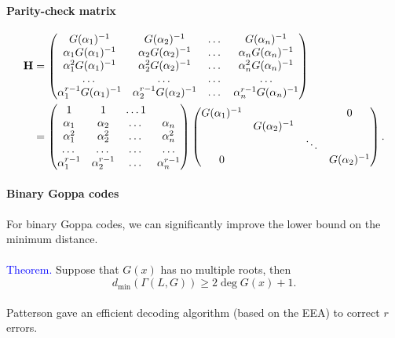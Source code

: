\documentclass[a4paper, 11pt, openany]{book}
\numberwithin{equation}{section}
\theoremstyle{plain}
\theoremstyle{definition}
\newcommand{\dmin}{d_{\min}}
\newcommand{\Structure}[1]{\textcolor{blue}{#1}}
\newcommand{\code}[1]{\mathsf{#1}}
\newcommand{\Goppa}                 {\code{\Gamma}}
\begin{document}
\paragraph{Parity-check matrix}

\begin{align*}
	{\bf H} &= \begin{pmatrix}
		G(\alpha_1)^{-1} & G(\alpha_2)^{-1} & \dots & G(\alpha_n)^{-1}\\
		\alpha_1 G(\alpha_1)^{-1} & \alpha_2 G(\alpha_2)^{-1} & \dots & \alpha_n G(\alpha_n)^{-1}\\
		\alpha_1^2 G(\alpha_1)^{-1} & \alpha_2^2 G(\alpha_2)^{-1} & \dots & \alpha_n^2 G(\alpha_n)^{-1}\\
		\dots & \dots & \dots & \dots\\
		\alpha_1^{r-1} G(\alpha_1)^{-1} & \alpha_2^{r-1} G(\alpha_2)^{-1} & \dots & \alpha_n^{r-1} G(\alpha_n)^{-1}
	\end{pmatrix}\\
	&= \begin{pmatrix}
			1 & 1 & \dots 1\\
			\alpha_1 & \alpha_2 & \dots & \alpha_n \\
			\alpha_1^2 & \alpha_2^2 & \dots & \alpha_n^2 \\
			\dots & \dots & \dots & \dots\\
			\alpha_1^{r-1} & \alpha_2^{r-1} & \dots & \alpha_n^{r-1}
		\end{pmatrix}
		\begin{pmatrix}
		G(\alpha_1)^{-1} 	&  		& 		& 0		\\
		 		& G(\alpha_2)^{-1} 	& 		&  		\\
				&		& \ddots& 		\\
		0		&		&		&G(\alpha_2)^{-1}	
		\end{pmatrix}.
\end{align*}



\paragraph{Binary Goppa codes}

For binary Goppa codes, we can significantly improve the lower bound on the minimum distance.\\
~\\
\Structure{Theorem.} Suppose that $G(x)$ has no multiple roots, then
\[
	\dmin(\Goppa (L,G) ) \ge 2 \deg G(x) + 1.
\]
~\\
Patterson gave an efficient decoding algorithm (based on the EEA) to correct $r$ errors.
\end{document}
